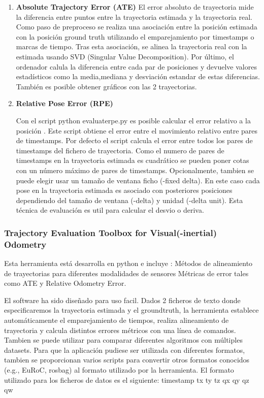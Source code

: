 \begin {enumerate}
\item \textbf{Absolute Trajectory Error (ATE)}
 El error absoluto de trayectoria mide la diferencia entre puntos entre la trayectoria estimada y la trayectoria real. Como paso de preproceso se realiza una asociación entre la posición estimada con la posición ground truth utilizando el emparejamiento por timestamps o marcas de tiempo. Tras esta asociación, se alinea la trayectoria real con la estimada usando SVD (Singular Value Decomposition). Por último, el ordenador calula la diferencia entre cada par de posiciones y devuelve valores estadísticos como la media,mediana y desviación estandar de estas diferencias. También es posible obtener gráficos con las 2 trayectorias.
\item \textbf{Relative Pose Error (RPE)}

Con el script python evaluaterpe.py es posible calcular el error relativo a la posición . Este script obtiene el error entre el movimiento relativo entre pares de timestamps. Por defecto el script calcula el error entre todos los pares de timestamps del fichero de trayectoria. Como el numero de pares de timestamps en la trayectoria estimada es cuadrático se pueden poner cotas con un número máximo de pares de timestamps. Opcionalmente, tambien se puede elegir usar un tamaño de ventana ficho (-fixed delta). En este caso cada pose en la trayectoria estimada es asociado con posteriores posiciones dependiendo del tamaño de ventana (-delta) y unidad (-delta unit). Esta técnica de evaluación es util para calcular el desvio o deriva.



\end {enumerate}

\subsubsection{Trajectory Evaluation Toolbox for Visual(-inertial) Odometry}
Esta herramienta está desarrolla en python e incluye : 
Métodos de alineamiento de trayectorias para diferentes modalidades de sensores
Métricas de error tales como ATE y Relative Odometry Error. \cite{Zhang18iros}

El software ha sido diseñado para uso facil. Dados 2 ficheros de texto donde especificaremos la trayectoria estimada y el groundtruth, la herramienta establece automáticamente el emparejamiento de tiempos, realiza alineamiento de trayectoria y calcula distintos errores métricos con una línea de comandos. Tambien se puede utilizar para comparar diferentes algoritmos con múltiples datasets. Para que la aplicación pudiese ser utilizada con diferentes formatos, tambien se proporcionan varios scripts para convertir otros formatos conocidos (e.g., EuRoC, rosbag) al formato utilizado por la herramienta.
El formato utilizado para los ficheros de datos es el siguiente: timestamp tx ty tz qx qy qz qw

